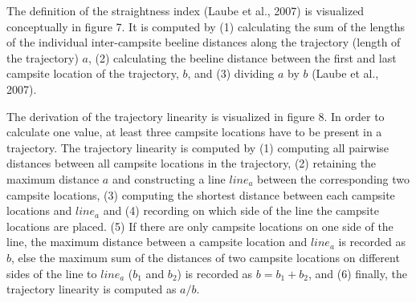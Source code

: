 \documentclass[]{elsarticle} %
\begin{document}
The definition of the straightness index (Laube et al., 2007) is
visualized conceptually in figure 7. It is computed by (1) calculating
the sum of the lengths of the individual inter-campsite beeline
distances along the trajectory (length of the trajectory) \(a\), (2)
calculating the beeline distance between the first and last campsite
location of the trajectory, \(b\), and (3) dividing \(a\) by \(b\)
(Laube et al., 2007).

The derivation of the trajectory linearity is visualized in figure 8. In
order to calculate one value, at least three campsite locations have to
be present in a trajectory. The trajectory linearity is computed by (1)
computing all pairwise distances between all campsite locations in the
trajectory, (2) retaining the maximum distance \(a\) and constructing a
line \(line_a\) between the corresponding two campsite locations, (3)
computing the shortest distance between each campsite locations and
\(line_a\) and (4) recording on which side of the line the campsite
locations are placed. (5) If there are only campsite locations on one
side of the line, the maximum distance between a campsite location and
\(line_a\) is recorded as \(b\), else the maximum sum of the distances
of two campsite locations on different sides of the line to \(line_a\)
(\(b_1\) and \(b_2\)) is recorded as \(b = b_1 + b_2\), and (6) finally,
the trajectory linearity is computed as \(a/b\).

\begingroup\fontsize{7}{9}\selectfont
\end{document}
